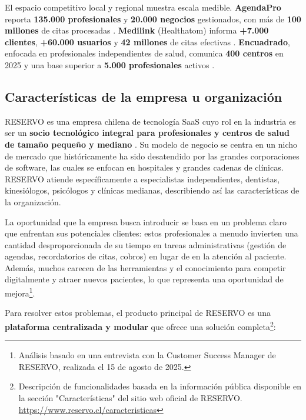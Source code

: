 El espacio competitivo local y regional muestra escala medible. \textbf{AgendaPro} reporta \textbf{135.000 profesionales} y \textbf{20.000 negocios} gestionados, con más de \textbf{100 millones} de citas procesadas \citep{AgendaPro2025BusinessWire}. \textbf{Medilink} (Healthatom) informa \textbf{+7.000 clientes}, \textbf{+60.000 usuarios} y \textbf{42 millones} de citas efectivas \citep{MedilinkWeb2025}. \textbf{Encuadrado}, enfocada en profesionales independientes de salud, comunica \textbf{400 centros} en 2025 y una base superior a \textbf{5.000 profesionales} activos \citep{Encuadrado2025Centros}.



\subsection{Características de la empresa u organización}

RESERVO es una empresa chilena de tecnología SaaS cuyo rol en la industria es ser un \textbf{socio tecnológico integral para profesionales y centros de salud de tamaño pequeño y mediano} \citep{ReservoQuienesSomos2025}. Su modelo de negocio se centra en un nicho de mercado que históricamente ha sido desatendido por las grandes corporaciones de software, las cuales se enfocan en hospitales y grandes cadenas de clínicas. RESERVO atiende específicamente a especialistas independientes, dentistas, kinesiólogos, psicólogos y clínicas medianas, describiendo así las características de la organización.

La oportunidad que la empresa busca introducir se basa en un problema claro que enfrentan sus potenciales clientes: estos profesionales a menudo invierten una cantidad desproporcionada de su tiempo en tareas administrativas (gestión de agendas, recordatorios de citas, cobros) en lugar de en la atención al paciente. Además, muchos carecen de las herramientas y el conocimiento para competir digitalmente y atraer nuevos pacientes, lo que representa una oportunidad de mejora\footnote{Análisis basado en una entrevista con la Customer Success Manager de RESERVO, realizada el 15 de agosto de 2025.}.

Para resolver estos problemas, el producto principal de RESERVO es una \textbf{plataforma centralizada y modular} que ofrece una solución completa\footnote{Descripción de funcionalidades basada en la información pública disponible en la sección "Características" del sitio web oficial de RESERVO. \url{https://www.reservo.cl/caracteristicas}}:


